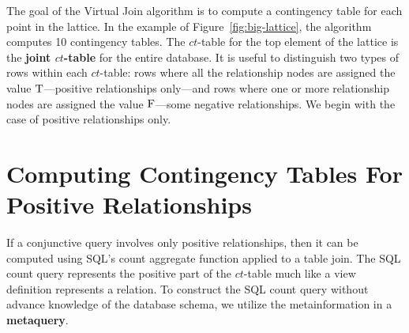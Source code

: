 \documentclass{vldb}
\newcommand{\ct}{\mathit{ct}}
\begin{document}
The goal of the Virtual Join algorithm is to compute a contingency table for each point in the lattice. 
In the example of Figure~\ref{fig:big-lattice}, the algorithm computes 10 contingency tables. The $\ct$-table for the top element of the lattice is the \textbf{joint $\ct$-table} for the entire database. 
It is useful to distinguish two types of rows within each $\ct$-table: rows where all the relationship nodes are assigned the value $\mathrm{T}$---positive relationships only---and rows where one or more relationship nodes are assigned the value $\mathrm{F}$---some negative relationships. 
We begin with the case of positive relationships only.


\section{Computing Contingency Tables For Positive Relationships} 
If a conjunctive query involves only positive relationships, then it can be computed using SQL's count aggregate function applied to a table join. The SQL count query represents the positive part of the $\ct$-table much like a view definition represents a relation. 
To construct the SQL count query without advance knowledge of the database schema, we utilize the metainformation in a \textbf{metaquery}.
\end{document}

